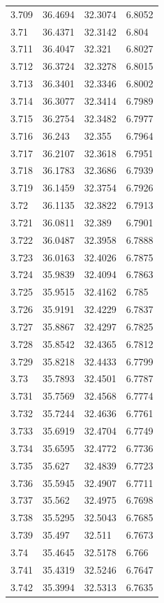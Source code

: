 \begin{tabular}{llll}
3.709 & 36.4694 & 32.3074 & 6.8052 \\
3.71 & 36.4371 & 32.3142 & 6.804 \\
3.711 & 36.4047 & 32.321 & 6.8027 \\
3.712 & 36.3724 & 32.3278 & 6.8015 \\
3.713 & 36.3401 & 32.3346 & 6.8002 \\
3.714 & 36.3077 & 32.3414 & 6.7989 \\
3.715 & 36.2754 & 32.3482 & 6.7977 \\
3.716 & 36.243 & 32.355 & 6.7964 \\
3.717 & 36.2107 & 32.3618 & 6.7951 \\
3.718 & 36.1783 & 32.3686 & 6.7939 \\
3.719 & 36.1459 & 32.3754 & 6.7926 \\
3.72 & 36.1135 & 32.3822 & 6.7913 \\
3.721 & 36.0811 & 32.389 & 6.7901 \\
3.722 & 36.0487 & 32.3958 & 6.7888 \\
3.723 & 36.0163 & 32.4026 & 6.7875 \\
3.724 & 35.9839 & 32.4094 & 6.7863 \\
3.725 & 35.9515 & 32.4162 & 6.785 \\
3.726 & 35.9191 & 32.4229 & 6.7837 \\
3.727 & 35.8867 & 32.4297 & 6.7825 \\
3.728 & 35.8542 & 32.4365 & 6.7812 \\
3.729 & 35.8218 & 32.4433 & 6.7799 \\
3.73 & 35.7893 & 32.4501 & 6.7787 \\
3.731 & 35.7569 & 32.4568 & 6.7774 \\
3.732 & 35.7244 & 32.4636 & 6.7761 \\
3.733 & 35.6919 & 32.4704 & 6.7749 \\
3.734 & 35.6595 & 32.4772 & 6.7736 \\
3.735 & 35.627 & 32.4839 & 6.7723 \\
3.736 & 35.5945 & 32.4907 & 6.7711 \\
3.737 & 35.562 & 32.4975 & 6.7698 \\
3.738 & 35.5295 & 32.5043 & 6.7685 \\
3.739 & 35.497 & 32.511 & 6.7673 \\
3.74 & 35.4645 & 32.5178 & 6.766 \\
3.741 & 35.4319 & 32.5246 & 6.7647 \\
3.742 & 35.3994 & 32.5313 & 6.7635 \\

\end{tabular}
